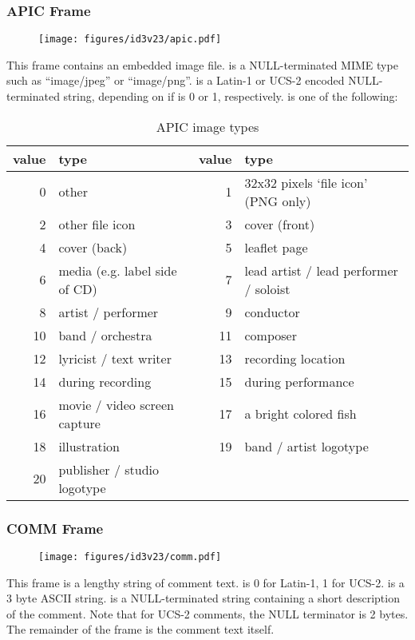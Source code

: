 \subsubsection{APIC Frame}
\begin{figure}[h]
\texttt{[image: figures/id3v23/apic.pdf]}
\end{figure}
This frame contains an embedded image file.
 is a NULL-terminated MIME type such as ``image/jpeg''
or ``image/png''.
 is a Latin-1 or UCS-2 encoded NULL-terminated string,
depending on if  is 0 or 1, respectively.
 is one of the following:
\begin{table}[h]
{
\begin{tabular}{|r|l||r|l|}
\hline
value & type & value & type \\
\hline
0 & other & 1 & 32x32 pixels `file icon' (PNG only) \\
2 & other file icon & 3 & cover (front) \\
4 & cover (back) & 5 & leaflet page \\
6 & media (e.g. label side of CD) & 7 & lead artist / lead performer / soloist \\
8 & artist / performer & 9 & conductor \\
10 & band / orchestra & 11 & composer \\
12 & lyricist / text writer & 13 & recording location \\
14 & during recording & 15 & during performance \\
16 & movie / video screen capture & 17 & a bright colored fish \\
18 & illustration & 19 & band / artist logotype \\
20 & publisher / studio logotype & &  \\
\hline
\end{tabular}
\caption{APIC image types}
}
\end{table}

\clearpage

\subsubsection{COMM Frame}
\begin{figure}[h]
\texttt{[image: figures/id3v23/comm.pdf]}
\end{figure}
This frame is a lengthy string of comment text.
 is 0 for Latin-1, 1 for UCS-2.
 is a 3 byte ASCII string.
 is a NULL-terminated string
containing a short description of the comment.
Note that for UCS-2 comments, the NULL terminator is 2 bytes.
The remainder of the frame is the comment text itself.

